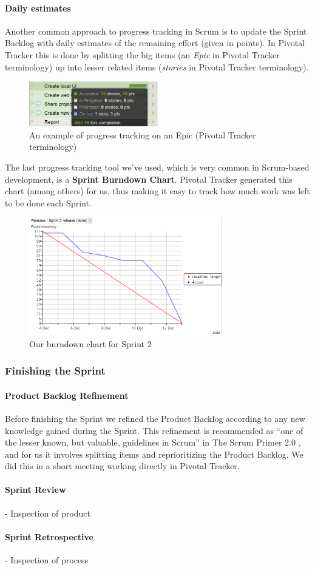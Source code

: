 \paragraph{Daily estimates}
Another common approach to progress tracking in Scrum is to update the Sprint Backlog with daily estimates of the remaining effort (given in points). In Pivotal Tracker this is done by splitting the big items (an \textit{Epic} in Pivotal Tracker terminology) up into lesser related items (\textit{stories} in Pivotal Tracker terminology).
\begin{figure}[htb]
	\centering
	\includegraphics[width=0.50\textwidth]{SCRUM/graphics/epic-example.png}
	\caption{An example of progress tracking on an Epic (Pivotal Tracker terminology)}
	\label{fig:epic-example}
\end{figure}

The last progress tracking tool we've used, which is very common in Scrum-based development, is a  \textbf{Sprint Burndown Chart}. Pivotal Tracker generated this chart (among others) for us, thus making it easy to track how much work was left to be done each Sprint.
\begin{figure}[htb]
	\centering
	\includegraphics[width=0.75\textwidth]{SCRUM/graphics/burndown-chart.png}
	\caption{Our burndown chart for Sprint 2}
	\label{fig:burndown-chart}
\end{figure}


\subsubsection{Finishing the Sprint}

\paragraph{Product Backlog Refinement}
Before finishing the Sprint we refined the Product Backlog according to any new knowledge gained during the Sprint. This refinement is recommended as ``one of the lesser known, but valuable, guidelines in Scrum'' in The Scrum Primer 2.0 \cite{ScrumPrimer2}, and for us it involves splitting items and reprioritizing the Product Backlog. We did this in a short meeting working directly in Pivotal Tracker.

\paragraph{Sprint Review}
- Inspection of product

\paragraph{Sprint Retrospective}
- Inspection of process